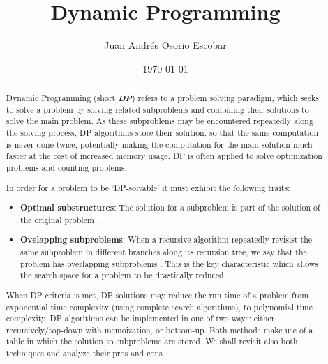 \documentclass{article}
\begin{document}
\title{Dynamic Programming}
\author{Juan Andrés Osorio Escobar}
\date{\today}
\maketitle

\begin{abstract}
Dynamic Programming (short \textbf{\emph{DP}}) refers to a problem solving paradigm,
  which seeks to solve a problem by solving related subproblems and combining their solutions to solve the main problem.
  As these subproblems may be encountered repeatedly along the solving process, DP algorithms store their solution, so 
  that the same computation is never done twice, potentially making the computation for the main solution much faster at 
  the cost of increased memory usage. DP is often applied to solve optimization problems and counting problems.

  In order for a problem to be 'DP-solvable' it must exhibit the following traits:

  \begin{itemize}
    \item \textbf{Optimal substructures}: The solution for a subproblem is part of the solution of the original problem \cite{halim2013competitive}.
    \item \textbf{Ovelapping subproblems}: When a recursive algorithm repeatedly revisist the same subproblem in different branches along its recursion tree, we say that the problem has overlapping subproblems \cite{cormen2009introduction}. This is the key characteristic
    which allows the search space for a problem to be drastically reduced \cite{halim2013competitive}.
  \end{itemize}
  
  When DP criteria is met, DP solutions may reduce the run time of a problem from exponential 
  time complexity (using complete search algorithms), to polynomial time complexity. DP algorithms can be implemented
  in one of two ways: either recursively/top-down with memoization, or bottom-up. Both methods make use of a table in which the solution to subproblems are stored.
  We shall revisit also both techniques and analyze their pros and cons.

  
  


  
\end{abstract}
\end{document}
